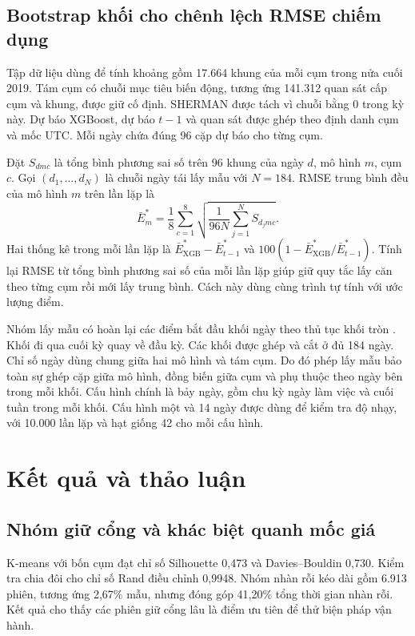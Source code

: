 \documentclass[conference,a4paper]{IEEEtran}
\begin{document}
\subsection{Bootstrap khối cho chênh lệch RMSE chiếm dụng}
\label{sec:bootstrap_detail}
Tập dữ liệu dùng để tính khoảng gồm 17.664 khung của mỗi cụm trong nửa cuối 2019. Tám cụm có chuỗi mục tiêu biến động, tương ứng 141.312 quan sát cấp cụm và khung, được giữ cố định. SHERMAN được tách vì chuỗi bằng 0 trong kỳ này. Dự báo XGBoost, dự báo $t-1$ và quan sát được ghép theo định danh cụm và mốc UTC. Mỗi ngày chứa đúng 96 cặp dự báo cho từng cụm.

Đặt $S_{dmc}$ là tổng bình phương sai số trên 96 khung của ngày $d$, mô hình $m$, cụm $c$. Gọi $(d_1,\ldots,d_N)$ là chuỗi ngày tái lấy mẫu với $N=184$. RMSE trung bình đều của mô hình $m$ trên lần lặp là
\begin{equation}
\bar E_m^*=\frac{1}{8}\sum_{c=1}^{8}
\sqrt{\frac{1}{96N}\sum_{j=1}^{N} S_{d_jmc}}.
\end{equation}
Hai thống kê trong mỗi lần lặp là $\bar E_{\mathrm{XGB}}^*-\bar E_{t-1}^*$ và
$100(1-\bar E_{\mathrm{XGB}}^*/\bar E_{t-1}^*)$. Tính lại RMSE từ tổng bình phương sai số của mỗi lần lặp giúp giữ quy tắc lấy căn theo từng cụm rồi mới lấy trung bình. Cách này dùng cùng trình tự tính với ước lượng điểm.

Nhóm lấy mẫu có hoàn lại các điểm bắt đầu khối ngày theo thủ tục khối tròn \cite{politis1992}. Khối đi qua cuối kỳ quay về đầu kỳ. Các khối được ghép và cắt ở đủ 184 ngày. Chỉ số ngày dùng chung giữa hai mô hình và tám cụm. Do đó phép lấy mẫu bảo toàn sự ghép cặp giữa mô hình, đồng biến giữa cụm và phụ thuộc theo ngày bên trong mỗi khối. Cấu hình chính là bảy ngày, gồm chu kỳ ngày làm việc và cuối tuần trong mỗi khối. Cấu hình một và 14 ngày được dùng để kiểm tra độ nhạy, với 10.000 lần lặp và hạt giống 42 cho mỗi cấu hình.

\section{Kết quả và thảo luận}
\subsection{Nhóm giữ cổng và khác biệt quanh mốc giá}
K-means với bốn cụm đạt chỉ số Silhouette 0,473 và Davies--Bouldin 0,730. Kiểm tra chia đôi cho chỉ số Rand điều chỉnh 0,9948. Nhóm nhàn rỗi kéo dài gồm 6.913 phiên, tương ứng 2,67\% mẫu, nhưng đóng góp 41,20\% tổng thời gian nhàn rỗi. Kết quả cho thấy các phiên giữ cổng lâu là điểm ưu tiên để thử biện pháp vận hành.
\end{document}
